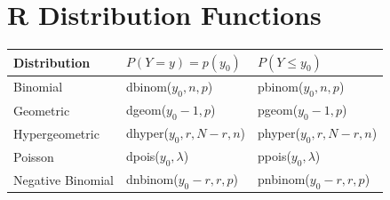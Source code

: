 \documentclass{article}
\theoremstyle{plain}
\theoremstyle{definition}
\theoremstyle{remark}
\begin{document}
\section{R Distribution Functions}
\begin{tabular}{l | l l}
Distribution & $P(Y=y) = p(y_0)$ & $P(Y \leq y_0)$\\
\hline
Binomial & dbinom($y_0,n,p$) & pbinom($y_0,n,p$)\\
Geometric & dgeom($y_0-1,p$) & pgeom($y_0-1,p$)\\
Hypergeometric & dhyper($y_0,r,N-r,n$) & phyper($y_0,r,N-r,n$)\\
Poisson & dpois($y_0,\lambda$) & ppois($y_0,\lambda$)\\  
Negative Binomial & dnbinom($y_0-r,r,p$) & pnbinom($y_0-r,r,p$)
\end{tabular}
\end{document}
